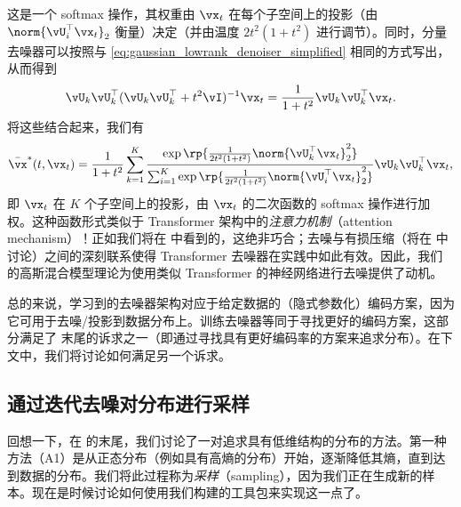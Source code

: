 \documentclass[../../book-main_zh.tex]{subfiles}
\begin{document}
这是一个 softmax 操作，其权重由 \(\vx_{t}\) 在每个子空间上的投影（由 \(\norm{\vU_{i}^{\top}\vx_{t}}_{2}\) 衡量）决定（并由温度 \(2t^{2}(1 + t^{2})\) 进行调节）。同时，分量去噪器可以按照与 \eqref{eq:gaussian_lowrank_denoiser_simplified} 相同的方式写出，从而得到
\begin{equation}
    \vU_{k}\vU_{k}^{\top}(\vU_{k}\vU_{k}^{\top} +
    t^{2}\vI)^{-1}\vx_{t} = \frac{1}{1 + t^{2}}\vU_{k}\vU_{k}^{\top}\vx_{t}.
\end{equation}
将这些结合起来，我们有
\begin{equation}\label{eq:gmm_lowrank_denoiser}
    \bar{\vx}^{\ast}(t, \vx_{t}) = \frac{1}{1 + t^{2}}\sum_{k =
    1}^{K}\frac{\exp\rp{\frac{1}{2t^{2}(1 +
    t^{2})}\norm{\vU_{k}^{\top}\vx_{t}}_{2}^{2}}}{\sum_{i =
        1}^{K}\exp\rp{\frac{1}{2t^{2}(1 +
    t^{2})}\norm{\vU_{i}^{\top}\vx_{t}}_{2}^{2}}}\vU_{k}\vU_{k}^{\top}\vx_{t},
\end{equation}
即 \(\vx_{t}\) 在 \(K\) 个子空间上的投影，由 \(\vx_{t}\) 的二次函数的 softmax 操作进行加权。这种函数形式类似于 Transformer 架构中的\textit{注意力机制}（attention mechanism）！正如我们将在  中看到的，这绝非巧合；去噪与有损压缩（将在  中讨论）之间的深刻联系使得 Transformer 去噪器在实践中如此有效。因此，我们的高斯混合模型理论为使用类似 Transformer 的神经网络进行去噪提供了动机。

总的来说，学习到的去噪器架构对应于给定数据的（隐式参数化）编码方案，因为它可用于去噪/投影到数据分布上。训练去噪器等同于寻找更好的编码方案，这部分满足了  末尾的诉求之一（即通过寻找具有更好编码率的方案来追求分布）。在下文中，我们将讨论如何满足另一个诉求。

\subsection{通过迭代去噪对分布进行采样}\label{sub:sampling_denoising}

回想一下，在  的末尾，我们讨论了一对追求具有低维结构的分布的方法。第一种方法（A1）是从正态分布（例如具有高熵的分布）开始，逐渐降低其熵，直到达到数据的分布。我们将此过程称为\textit{采样}（sampling），因为我们正在生成新的样本。现在是时候讨论如何使用我们构建的工具包来实现这一点了。
\end{document}
